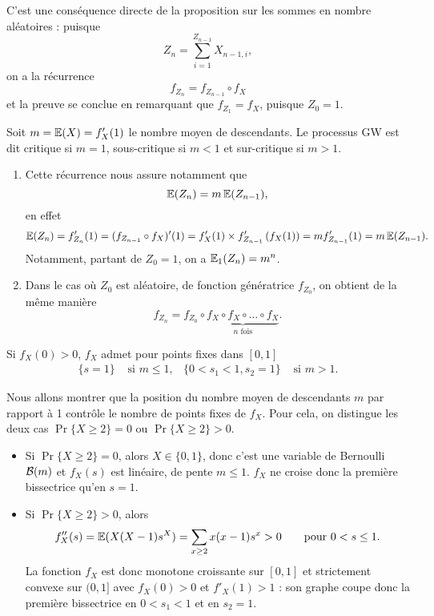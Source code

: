\proof 
C'est une conséquence directe de la proposition sur les sommes en nombre aléatoires : puisque
$$
Z_n = \sum_{i=1}^{Z_{n-1}} X_{n-1, i},
$$
on a la récurrence 
$$
f_{Z_n} = f_{Z_{n-1}} \circ f_X
$$
et la preuve se conclue en remarquant que $f_{Z_1} = f_X$, puisque $Z_0 = 1$.
\eproof

\begin{definition}
  Soit $m = \operatorname{\mathbb{E}}(X) = f'_X(1)$ le nombre moyen de descendants. Le processus GW est dit critique si $m=1$, sous-critique si $m < 1$ et sur-critique si $m > 1$.
\end{definition}

\remarks
\begin{enumerate}
  \item Cette récurrence nous assure notamment que
  $$
  \operatorname{\mathbb{E}}(Z_n) = m \operatorname{\mathbb{E}}(Z_{n-1}),
  $$
  en effet
  \begin{align*}
    \operatorname{\mathbb{E}}(Z_n) 
    = f'_{Z_n}(1) = (f_{Z_{n-1}} \circ f_X)'(1) 
    = f'_X(1) \times f'_{Z_{n-1}}\left(f_X(1)\right) 
    = m f'_{Z_{n-1}}(1) = m \operatorname{\mathbb{E}}(Z_{n-1}).
  \end{align*}
  Notamment, partant de $Z_0 = 1$, on a $\operatorname{\mathbb{E}}_1(Z_n) = m^n$.
  \item Dans le cas où $Z_0$ est aléatoire, de fonction génératrice $f_{Z_0}$, on obtient de la même manière
  $$
  f_{Z_n} =  f_{Z_0} \circ \underset{n \text{ fois}}{\underbrace{f_X \circ f_X \circ \dots \circ f_X}}.
  $$
\end{enumerate}

\begin{lemma} \label{lem:GWnombrePointsFixes}
  Si $f_X(0) > 0$, $f_X$ admet pour points fixes dans $[0, 1]$
  \begin{align*}
    \{s = 1\} & \text{ si } m \leq 1, &
    \{0 < s_1 < 1, s_2=1\} & \text{ si } m > 1.
  \end{align*}
\end{lemma}

\proof
Nous allons montrer que la position du nombre moyen de descendants $m$ par rapport à 1 contrôle le nombre de points fixes de $f_X$.
Pour cela, on distingue les deux cas $\Pr\{X\geq 2\} = 0$ ou $\Pr\{X\geq 2\} > 0$.
\begin{itemize}
  \item Si $\Pr\{X\geq 2\} = 0$, alors $X \in \{0, 1\}$, donc c'est une variable de Bernoulli $\mathcal{B}(m)$ et $f_X(s)$ est linéaire, de pente $m \leq 1$. $f_X$ ne croise donc la première bissectrice qu'en $s = 1$.
  \item Si $\Pr\{X\geq 2\} > 0$, alors
  $$
  f''_X(s) = \operatorname{\mathbb{E}}(X(X-1) s^X) = \sum_{x \geq 2} x (x-1) s^x > 0
  \qquad \text{pour } 0 < s \leq 1.
  $$
  La fonction $f_X$ est donc monotone croissante sur $[0, 1]$ et strictement convexe sur $(0, 1]$ avec $f_X(0) > 0$ et $f'_X(1) > 1$ : son graphe coupe donc la première bissectrice en   $0 < s_1 < 1$ et en $s_2=1$.
\end{itemize}
\eproof

